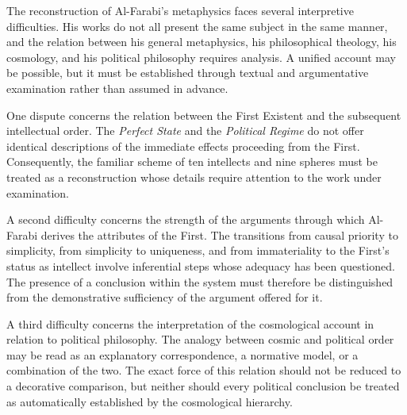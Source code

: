 The reconstruction of Al-Farabi's
metaphysics faces several
interpretive difficulties.
His works do not all present
the same subject in the same
manner, and the relation
between his general metaphysics,
his philosophical theology,
his cosmology, and his political
philosophy requires analysis.
A unified account may be
possible, but it must be
established through textual
and argumentative examination
rather than assumed in advance.
\citep[secs.~1--4]{MennAlFarabiMetaphysicsSEP2026}

\label{para:VS.B01.P01.C08.S12.SS12.P002}

One dispute concerns the relation
between the First Existent and
the subsequent intellectual
order. The \textit{Perfect State}
and the \textit{Political Regime}
do not offer identical descriptions
of the immediate effects proceeding
from the First. Consequently,
the familiar scheme of ten
intellects and nine spheres
must be treated as a reconstruction
whose details require attention
to the work under examination.
\citep[sec.~4]{MennAlFarabiMetaphysicsSEP2026}

\label{para:VS.B01.P01.C08.S12.SS12.P003}

A second difficulty concerns
the strength of the arguments
through which Al-Farabi derives
the attributes of the First.
The transitions from causal
priority to simplicity, from
simplicity to uniqueness, and
from immateriality to the
First's status as intellect
involve inferential steps
whose adequacy has been
questioned. The presence
of a conclusion within the
system must therefore be
distinguished from the
demonstrative sufficiency
of the argument offered
for it.
\citep[sec.~4]{MennAlFarabiMetaphysicsSEP2026}

\label{para:VS.B01.P01.C08.S12.SS12.P004}

A third difficulty concerns
the interpretation of the
cosmological account in
relation to political philosophy.
The analogy between cosmic
and political order may be
read as an explanatory
correspondence, a normative
model, or a combination
of the two. The exact force
of this relation should not
be reduced to a decorative
comparison, but neither
should every political
conclusion be treated as
automatically established
by the cosmological hierarchy.
\citep[sec.~3]{GermannAlFarabiSocietyReligionSEP2021}

\label{para:VS.B01.P01.C08.S12.SS12.P005}


